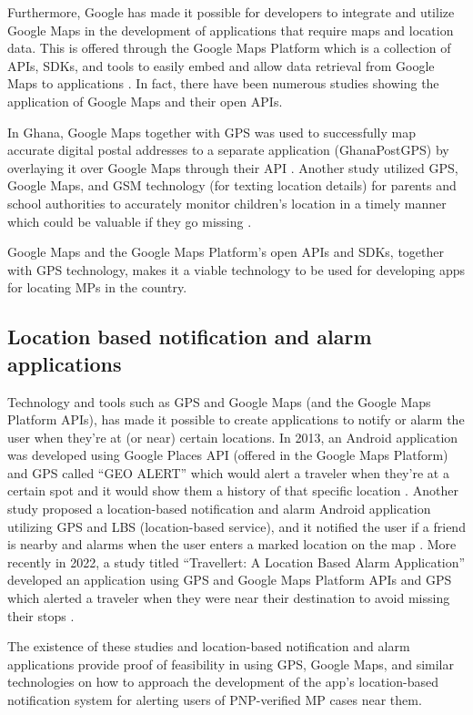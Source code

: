 Furthermore, Google has made it possible for developers to integrate and utilize Google Maps in the development of applications that require maps and location data. This is offered through the Google Maps Platform which is a collection of APIs, SDKs, and tools to easily embed and allow data retrieval from Google Maps to applications \cite{googleDevelopers}. In fact, there have been numerous studies showing the application of Google Maps and their open APIs. 

In Ghana, Google Maps together with GPS was used to successfully map accurate digital postal addresses to a separate application (GhanaPostGPS) by overlaying it over Google Maps through their API \cite{gah2018using}. Another study utilized GPS, Google Maps, and GSM technology (for texting location details) for parents and school authorities to accurately monitor children’s location in a timely manner which could be valuable if they go missing \cite{sunehra2016children}.

Google Maps and the Google Maps Platform’s open APIs and SDKs, together with GPS technology, makes it a viable technology to be used for developing apps for locating MPs in the country.

\subsection{Location based notification and alarm applications}
Technology and tools such as GPS and Google Maps (and the Google Maps Platform APIs), has made it possible to create applications to notify or alarm the user when they’re at (or near) certain locations. In 2013, an Android application was developed using Google Places API (offered in the Google Maps Platform) and GPS called “GEO ALERT” which would alert a traveler when they’re at a certain spot and it would show them a history of that specific location \cite{garg2013geo}. Another study proposed a location-based notification and alarm Android application utilizing GPS and LBS (location-based service), and it notified the user if a friend is nearby and alarms when the user enters a marked location on the map \cite{kanfade2018location}. More recently in 2022, a study titled “Travellert: A Location Based Alarm Application” developed an application using GPS and Google Maps Platform APIs and GPS which alerted a traveler when they were near their destination to avoid missing their stops \cite{travellert}.

The existence of these studies and location-based notification and alarm applications provide proof of feasibility in using GPS, Google Maps, and similar technologies on how to approach the development of the app’s location-based notification system for alerting users of PNP-verified MP cases near them.

